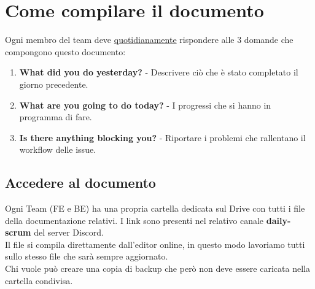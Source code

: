 \newpage
\section{Come compilare il documento}
Ogni membro del team deve \underline{quotidianamente} rispondere alle 3 domande che compongono questo documento: 
\begin{enumerate}
    \item \textbf{What did you do yesterday?} - Descrivere ciò che è stato completato il giorno precedente.  
    \item \textbf{What are you going to do today?} - I progressi che si hanno in programma di fare.
    \item \textbf{Is there anything blocking you?} - Riportare i problemi che rallentano il workflow delle issue. 
\end{enumerate}

\subsection{Accedere al documento}
Ogni Team (FE e BE) ha una propria cartella dedicata sul Drive con tutti i file della documentazione relativi. I link sono presenti nel relativo canale \textbf{daily-scrum} del server Discord.\\
Il file si compila direttamente dall'editor online, in questo modo lavoriamo tutti sullo stesso file che sarà sempre aggiornato.\\
Chi vuole può creare una copia di backup che però non deve essere caricata nella cartella condivisa. 